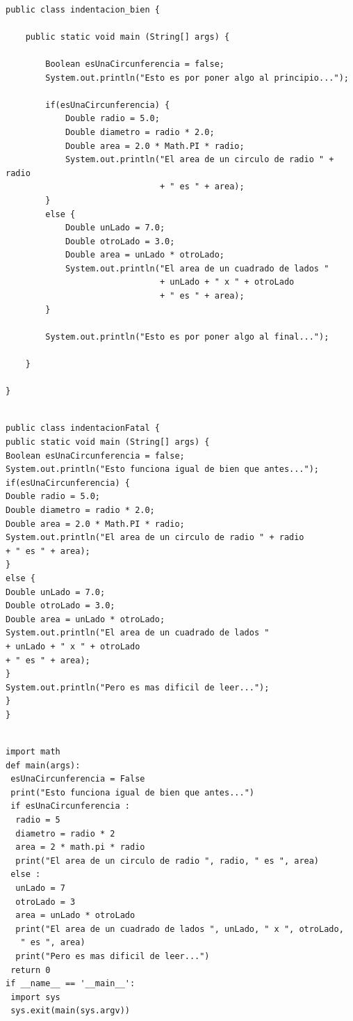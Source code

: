 \documentclass[spanish,12pt,a4paper,final,oneside]{book}
\begin{document}
\begin{lstlisting}[frame=single, caption=lenguaje Java : indentación correcta]

public class indentacion_bien {
	
    public static void main (String[] args) {
        
        Boolean esUnaCircunferencia = false;
        System.out.println("Esto es por poner algo al principio...");
        
        if(esUnaCircunferencia) {
            Double radio = 5.0;
            Double diametro = radio * 2.0;
            Double area = 2.0 * Math.PI * radio;
            System.out.println("El area de un circulo de radio " + radio 
                               + " es " + area);
        }
        else {
            Double unLado = 7.0;
            Double otroLado = 3.0;
            Double area = unLado * otroLado;
            System.out.println("El area de un cuadrado de lados "
                               + unLado + " x " + otroLado 
                               + " es " + area);
        }
              
        System.out.println("Esto es por poner algo al final...");
        
    }
    
}
\end{lstlisting}


\begin{lstlisting}[frame=single, caption=lenguaje Java : indentación lo peor posible]

public class indentacionFatal {
public static void main (String[] args) {
Boolean esUnaCircunferencia = false;
System.out.println("Esto funciona igual de bien que antes...");
if(esUnaCircunferencia) {
Double radio = 5.0;
Double diametro = radio * 2.0;
Double area = 2.0 * Math.PI * radio;
System.out.println("El area de un circulo de radio " + radio 
+ " es " + area);
}
else {
Double unLado = 7.0;
Double otroLado = 3.0;
Double area = unLado * otroLado;
System.out.println("El area de un cuadrado de lados "
+ unLado + " x " + otroLado 
+ " es " + area);
}
System.out.println("Pero es mas dificil de leer...");
}
}
\end{lstlisting}


\begin{lstlisting}[frame=single, caption=lenguaje Python : indentación lo peor posible]

import math
def main(args):
 esUnaCircunferencia = False
 print("Esto funciona igual de bien que antes...")
 if esUnaCircunferencia :
  radio = 5
  diametro = radio * 2
  area = 2 * math.pi * radio
  print("El area de un circulo de radio ", radio, " es ", area)
 else :
  unLado = 7
  otroLado = 3
  area = unLado * otroLado
  print("El area de un cuadrado de lados ", unLado, " x ", otroLado, 
   " es ", area)
  print("Pero es mas dificil de leer...")
 return 0
if __name__ == '__main__':
 import sys
 sys.exit(main(sys.argv))

\end{lstlisting}
\end{document}
